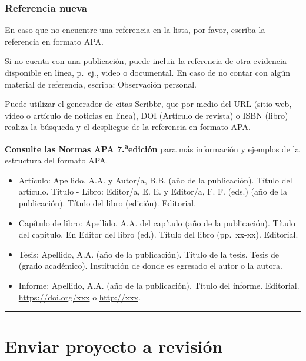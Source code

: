 \documentclass[
]{book}
\providecommand{\tightlist}{%
  \setlength{\itemsep}{0pt}\setlength{\parskip}{0pt}}
\begin{document}
\hypertarget{referencia-nueva}{%
\subsection*{Referencia nueva}\label{referencia-nueva}}

En caso que no encuentre una referencia en la lista, por favor, escriba la referencia en formato APA.

Si no cuenta con una publicación, puede incluir la referencia de otra evidencia disponible en línea, p.~ej., video o documental.
En caso de no contar con algún material de referencia, escriba: Observación personal.

Puede utilizar el generador de citas \href{https://www.scribbr.es/citar/generador/}{Scribbr}, que por medio del URL (sitio web, vídeo o artículo de noticias en línea), DOI (Artículo de revista) o ISBN (libro) realiza la búsqueda y el despliegue de la referencia en formato APA.

\textbf{Consulte las \href{https://www.revista.unam.mx/wp-content/uploads/3_Normas-APA-7-ed-2019-11-6.pdf}{Normas APA 7.\textsuperscript{a}edición}} para más información y ejemplos de la estructura del formato APA.

\begin{itemize}
\tightlist
\item
  Artículo: Apellido, A.A. y Autor/a, B.B. (año de la publicación). Título del artículo. Título - Libro: Editor/a, E. E. y Editor/a, F. F. (eds.) (año de la publicación). Título del libro (edición). Editorial.
\item
  Capítulo de libro: Apellido, A.A. del capítulo (año de la publicación). Título del capítulo. En Editor del libro (ed.). Título del libro (pp.~xx-xx). Editorial.
\item
  Tesis: Apellido, A.A. (año de la publicación). Título de la tesis. Tesis de (grado académico). Institución de donde es egresado el autor o la autora.
\item
  Informe: Apellido, A.A. (año de la publicación). Título del informe. Editorial. \url{https://doi.org/xxx} o \url{http://xxx}.
\end{itemize}

\begin{center}\rule{0.5\linewidth}{0.5pt}\end{center}

\hypertarget{enviar-proyecto-a-revisiuxf3n}{%
\chapter*{Enviar proyecto a revisión}\label{enviar-proyecto-a-revisiuxf3n}}
\end{document}
